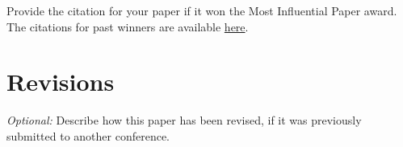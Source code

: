 Provide the citation for your paper if it won the Most Influential
Paper award. The citations for past winners are available
\href{https://www.sigarch.org/benefit/awards/acm-sigarch-sigplan-sigops-asplos-influential-paper-award/}{here}.


\section{Revisions}
\label{sec:revisions}

\emph{Optional:} Describe how this paper has been revised, if it was previously submitted to another conference.

\pagebreak




